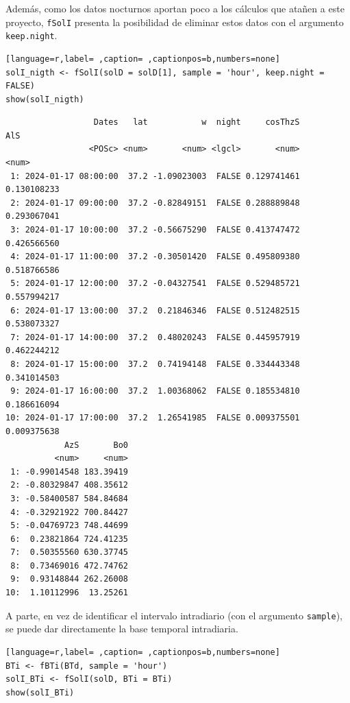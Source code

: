 Además, como los datos nocturnos aportan poco a los cálculos que atañen a este proyecto, \texttt{fSolI} presenta la posibilidad de eliminar estos datos con el argumento \texttt{keep.night}.
\begin{lstlisting}[language=r,label= ,caption= ,captionpos=b,numbers=none]
solI_nigth <- fSolI(solD = solD[1], sample = 'hour', keep.night = FALSE)
show(solI_nigth)
\end{lstlisting}

\begin{verbatim}
                  Dates   lat           w  night     cosThzS         AlS
                 <POSc> <num>       <num> <lgcl>       <num>       <num>
 1: 2024-01-17 08:00:00  37.2 -1.09023003  FALSE 0.129741461 0.130108233
 2: 2024-01-17 09:00:00  37.2 -0.82849151  FALSE 0.288889848 0.293067041
 3: 2024-01-17 10:00:00  37.2 -0.56675290  FALSE 0.413747472 0.426566560
 4: 2024-01-17 11:00:00  37.2 -0.30501420  FALSE 0.495809380 0.518766586
 5: 2024-01-17 12:00:00  37.2 -0.04327541  FALSE 0.529485721 0.557994217
 6: 2024-01-17 13:00:00  37.2  0.21846346  FALSE 0.512482515 0.538073327
 7: 2024-01-17 14:00:00  37.2  0.48020243  FALSE 0.445957919 0.462244212
 8: 2024-01-17 15:00:00  37.2  0.74194148  FALSE 0.334443348 0.341014503
 9: 2024-01-17 16:00:00  37.2  1.00368062  FALSE 0.185534810 0.186616094
10: 2024-01-17 17:00:00  37.2  1.26541985  FALSE 0.009375501 0.009375638
            AzS       Bo0
          <num>     <num>
 1: -0.99014548 183.39419
 2: -0.80329847 408.35612
 3: -0.58400587 584.84684
 4: -0.32921922 700.84427
 5: -0.04769723 748.44699
 6:  0.23821864 724.41235
 7:  0.50355560 630.37745
 8:  0.73469016 472.74762
 9:  0.93148844 262.26008
10:  1.10112996  13.25261
\end{verbatim}

A parte, en vez de identificar el intervalo intradiario (con el argumento \texttt{sample}), se puede dar directamente la base temporal intradiaria.
\begin{lstlisting}[language=r,label= ,caption= ,captionpos=b,numbers=none]
BTi <- fBTi(BTd, sample = 'hour')
solI_BTi <- fSolI(solD, BTi = BTi)
show(solI_BTi)
\end{lstlisting}

